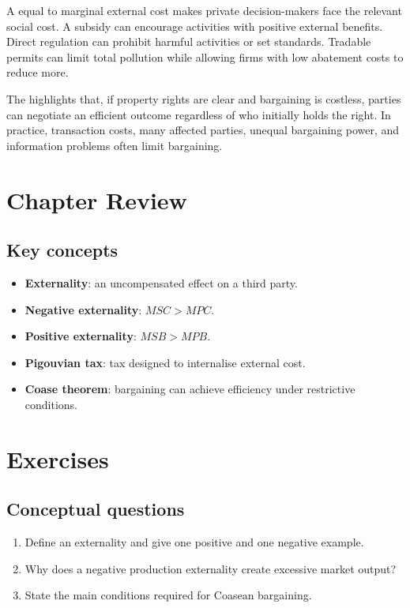 A  equal to marginal external cost makes private decision-makers face the relevant social cost. A subsidy can encourage activities with positive external benefits. Direct regulation can prohibit harmful activities or set standards. Tradable permits can limit total pollution while allowing firms with low abatement costs to reduce more.

The  highlights that, if property rights are clear and bargaining is costless, parties can negotiate an efficient outcome regardless of who initially holds the right. In practice, transaction costs, many affected parties, unequal bargaining power, and information problems often limit bargaining.

\section*{Chapter Review}

\subsection*{Key concepts}
\begin{itemize}
  \item \textbf{Externality}: an uncompensated effect on a third party.
  \item \textbf{Negative externality}: $MSC>MPC$.
  \item \textbf{Positive externality}: $MSB>MPB$.
  \item \textbf{Pigouvian tax}: tax designed to internalise external cost.
  \item \textbf{Coase theorem}: bargaining can achieve efficiency under restrictive conditions.
\end{itemize}

\section*{Exercises}

\subsection*{Conceptual questions}
\begin{enumerate}[label=\arabic*.]
  \item Define an externality and give one positive and one negative example.
  \item Why does a negative production externality create excessive market output?
  \item State the main conditions required for Coasean bargaining.
\end{enumerate}

